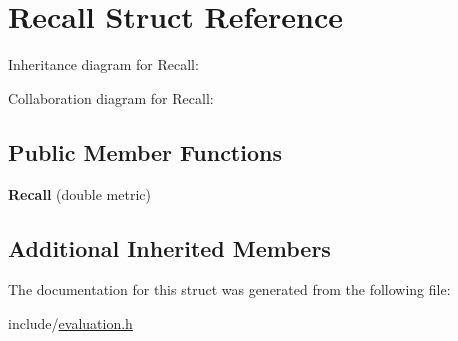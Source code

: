 \hypertarget{structRecall}{}\section{Recall Struct Reference}
\label{structRecall}


Inheritance diagram for Recall\+:


Collaboration diagram for Recall\+:
\subsection*{Public Member Functions}
\begin{DoxyCompactItemize}
\item 
\mbox{\label{structRecall_a9e43b7e283bb8f1516174894b1d09afa}} 
{\bfseries Recall} (double metric)
\end{DoxyCompactItemize}
\subsection*{Additional Inherited Members}


The documentation for this struct was generated from the following file\+:\begin{DoxyCompactItemize}
\item 
include/\hyperlink{evaluation_8h}{evaluation.\+h}\end{DoxyCompactItemize}
